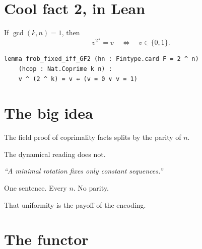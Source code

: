 \documentclass[11pt]{article}
\begin{document}
\bigskip


\newpage


\section{Cool fact 2, in Lean}

\bigskip

\begin{theorem}
If $\gcd(k,n) = 1$, then
\[
  v^{2^{\,k}} = v \quad\Longleftrightarrow\quad v \in \{0,1\}.
\]
\end{theorem}

\begin{lstlisting}
lemma frob_fixed_iff_GF2 (hn : Fintype.card F = 2 ^ n)
    (hcop : Nat.Coprime k n) :
    v ^ (2 ^ k) = v ↔ (v = 0 ∨ v = 1)
\end{lstlisting}

\bigskip


\newpage


\section{The big idea}

\bigskip

The field proof of coprimality facts splits by the parity of $n$.

\bigskip

The dynamical reading does not.

\bigskip

\begin{center}
\emph{``A minimal rotation fixes only constant sequences.''}
\end{center}

\bigskip

One sentence. Every $n$. No parity.

\bigskip

That uniformity is the payoff of the encoding.

\bigskip


\newpage


\section{The functor}
\end{document}
